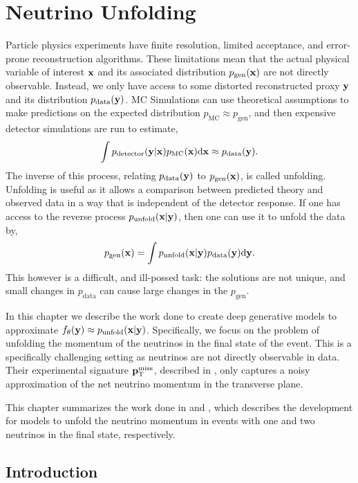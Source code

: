\chapter{Neutrino Unfolding}
\label{ch:gnns}

Particle physics experiments have finite resolution, limited acceptance, and error-prone reconstruction algorithms.
These limitations mean that the actual physical variable of interest $\mathbf{x}$ and its associated distribution $p_\text{gen}(\mathbf{x})$ are not directly observable.
Instead, we only have access to some distorted reconstructed proxy $\mathbf{y}$ and its distribution $p_\text{data}(\mathbf{y})$.
MC Simulations can use theoretical assumptions to make predictions on the expected distribution $p_\text{MC} \approx p_\text{gen}$, and then expensive detector simulations are run to estimate,
\begin{equation}
    \int p_\text{detector}(\mathbf{y}|\mathbf{x}) p_\text{MC}(\mathbf{x}) \mathrm{d}\mathbf{x} \approx p_\text{data}(\mathbf{y}).
\end{equation}
The inverse of this process, relating $p_\text{data}(\mathbf{y})$ to $p_\text{gen}(\mathbf{x})$, is called unfolding.
Unfolding is useful as it allows a comparison between predicted theory and observed data in a way that is independent of the detector response.
If one has access to the reverse process $p_\text{unfold}(\mathbf{x}|\mathbf{y})$, then one can use it to unfold the data by,
\begin{equation}
    p_\text{gen}(\mathbf{x}) = \int p_\text{unfold}(\mathbf{x}|\mathbf{y}) p_\text{data}(\mathbf{y}) \mathrm{d}\mathbf{y}.
\end{equation}
This however is a difficult, and ill-possed task: the solutions are not unique, and small changes in $p_\text{data}$ can cause large changes in the $p_\text{gen}$.

In this chapter we describe the work done to create deep generative models to approximate $f_\theta(\mathbf{y}) \approx p_\text{unfold}(\mathbf{x}|\mathbf{y})$.
Specifically, we focus on the problem of unfolding the momentum of the neutrinos in the final state of the event.
This is a specifically challenging setting as neutrinos are not directly observable in data.
Their experimental signature $\mathbf{p}_{\text{T}}^{\text{miss}}$, described in , only captures a noisy approximation of the net neutrino momentum in the transverse plane.

This chapter summarizes the work done in \textcite{NuFlows1} and \textcite{Nu2Flows}, which describes the development for models to unfold the neutrino momentum in events with one and two neutrinos in the final state, respectively.

\section{Introduction}

